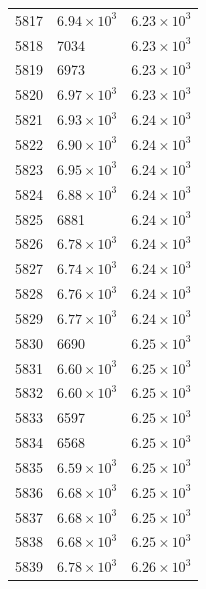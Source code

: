 \begin{table}[H]
\begin{tabular}{lll}
5817 & $\displaystyle 6.94 \times 10^{3}$ & $\displaystyle 6.23 \times 10^{3}$ \\
5818 & 7034 & $\displaystyle 6.23 \times 10^{3}$ \\
5819 & 6973 & $\displaystyle 6.23 \times 10^{3}$ \\
5820 & $\displaystyle 6.97 \times 10^{3}$ & $\displaystyle 6.23 \times 10^{3}$ \\
5821 & $\displaystyle 6.93 \times 10^{3}$ & $\displaystyle 6.24 \times 10^{3}$ \\
5822 & $\displaystyle 6.90 \times 10^{3}$ & $\displaystyle 6.24 \times 10^{3}$ \\
5823 & $\displaystyle 6.95 \times 10^{3}$ & $\displaystyle 6.24 \times 10^{3}$ \\
5824 & $\displaystyle 6.88 \times 10^{3}$ & $\displaystyle 6.24 \times 10^{3}$ \\
5825 & 6881 & $\displaystyle 6.24 \times 10^{3}$ \\
5826 & $\displaystyle 6.78 \times 10^{3}$ & $\displaystyle 6.24 \times 10^{3}$ \\
5827 & $\displaystyle 6.74 \times 10^{3}$ & $\displaystyle 6.24 \times 10^{3}$ \\
5828 & $\displaystyle 6.76 \times 10^{3}$ & $\displaystyle 6.24 \times 10^{3}$ \\
5829 & $\displaystyle 6.77 \times 10^{3}$ & $\displaystyle 6.24 \times 10^{3}$ \\
5830 & 6690 & $\displaystyle 6.25 \times 10^{3}$ \\
5831 & $\displaystyle 6.60 \times 10^{3}$ & $\displaystyle 6.25 \times 10^{3}$ \\
5832 & $\displaystyle 6.60 \times 10^{3}$ & $\displaystyle 6.25 \times 10^{3}$ \\
5833 & 6597 & $\displaystyle 6.25 \times 10^{3}$ \\
5834 & 6568 & $\displaystyle 6.25 \times 10^{3}$ \\
5835 & $\displaystyle 6.59 \times 10^{3}$ & $\displaystyle 6.25 \times 10^{3}$ \\
5836 & $\displaystyle 6.68 \times 10^{3}$ & $\displaystyle 6.25 \times 10^{3}$ \\
5837 & $\displaystyle 6.68 \times 10^{3}$ & $\displaystyle 6.25 \times 10^{3}$ \\
5838 & $\displaystyle 6.68 \times 10^{3}$ & $\displaystyle 6.25 \times 10^{3}$ \\
5839 & $\displaystyle 6.78 \times 10^{3}$ & $\displaystyle 6.26 \times 10^{3}$ \\

\end{tabular}
\end{table}
